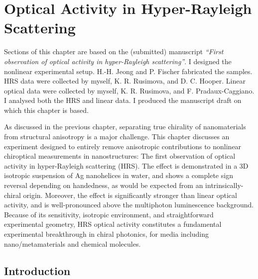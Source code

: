 \chapter{Optical Activity in Hyper-Rayleigh Scattering}\label{sec:results:HRS}

Sections of this chapter are based on the (submitted) manuscript \textit{``First observation of optical activity in hyper-Rayleigh scattering''}.
I designed the nonlinear experimental setup. H.-H. Jeong and P. Fischer fabricated the samples. HRS data were collected by myself, K. R. Rusimova, and D. C. Hooper. Linear optical data were collected by myself, K. R. Rusimova, and F. Pradaux-Caggiano. I analysed both the HRS and linear data. I produced the manuscript draft on which this chapter is based.

\bigskip \noindent
As discussed in the previous chapter, separating true chirality of nanomaterials from structural anisotropy is a major challenge. This chapter discusses an experiment designed to entirely remove anisotropic contributions to nonlinear chiroptical measurements in nanostructures: The first observation of optical activity in hyper-Rayleigh scattering (HRS). The effect is demonstrated in a 3D isotropic suspension of Ag nanohelices in water, and shows a complete sign reversal depending on handedness, as would be expected from an intrinsically-chiral origin. Moreover, the effect is significantly stronger than linear optical activity, and is well-pronounced above the multiphoton luminescence background. Because of its sensitivity, isotropic environment, and straightforward experimental geometry, HRS optical activity constitutes a fundamental experimental breakthrough in chiral photonics, for media including nano/metamaterials and chemical molecules. 


\section{Introduction}

